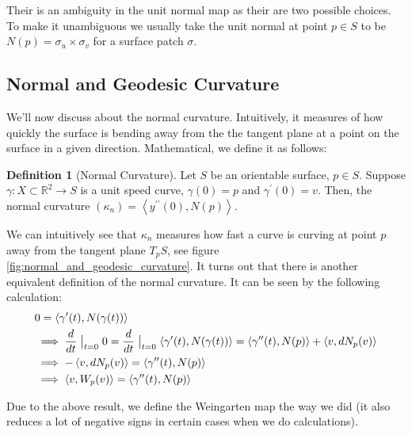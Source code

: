 \documentclass{article}
\theoremstyle{plain}
\theoremstyle{definition}
\newtheorem{definition}{Definition}
\theoremstyle{remark}
\newcommand{\R}{\mathbb{R}}
\begin{document}
Their is an ambiguity in the unit normal map as their are two possible choices. To make it unambiguous we usually take the unit normal at point \(p \in S\) to be \( N(p) = \sigma_u \times \sigma_v\) for a surface patch \( \sigma \).

\subsection{Normal and Geodesic Curvature}
We'll now discuss about the normal curvature. Intuitively, it measures of how quickly the surface is bending away from the the tangent plane at a point on the surface in a given direction. Mathematical, we define it as follows:

\begin{definition}[Normal Curvature]
    Let \(S\) be an orientable surface, \( p \in S\). Suppose \( \gamma: X \subset \R^2 \rightarrow S\) is a unit speed curve, \( \gamma(0) = p\) and \(\gamma^{\prime}(0) = v\). Then, the normal curvature \(( \kappa_n) = \left\langle y^{\prime \prime}(0), N(p)\right\rangle \).
\end{definition}

We can intuitively see that \(\kappa_n\) measures how fast a curve is curving at point \(p\) away from the tangent plane \(T_pS\), see figure \ref{fig:normal_and_geodesic_curvature}.
It turns out that there is another equivalent definition of the normal curvature. It can be seen by the following calculation:
\begin{align} \label{eq: relating two interpretaion of the normal curvature}
    \begin{split}
        & 0 = \left\langle \gamma^{\prime}(t) , N(\gamma(t)) \right\rangle \\
        & \implies \frac{d}{dt} \bigm|_{t=0} 0  = \frac{d}{dt} \bigm|_{t=0} \left\langle \gamma^{\prime}(t) , N(\gamma(t)) \right\rangle
        = \left\langle \gamma^{\prime \prime}(t), N(p)\right\rangle + \left\langle v, dN_p(v) \right\rangle \\
        & \implies  - \left\langle v, dN_p(v) \right\rangle  = \left\langle \gamma^{\prime \prime}(t), N(p)\right\rangle \\
        & \implies   \left\langle v, W_p(v) \right\rangle = \left\langle \gamma^{\prime \prime}(t), N(p)\right\rangle
    \end{split}
\end{align}

Due to the above result, we define the Weingarten map the way we did (it also reduces a lot of negative signs in certain cases when we do calculations). \\
\end{document}
